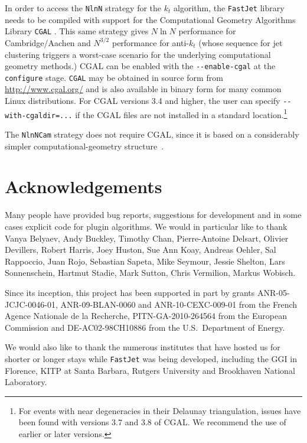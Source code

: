\documentclass[12pt,a4]{article}
\newcommand{\fastjet}{\texttt{FastJet}\xspace}
\newcommand{\ttt}[1]{{\small\texttt{#1}}}
\begin{document}
In order to access the \ttt{NlnN} strategy for the $k_t$ algorithm,
the \fastjet library needs to be compiled with support for the
Computational Geometry Algorithms Library \ttt{CGAL} \cite{CGAL}. This
same strategy gives $N\ln N$ performance for Cambridge/Aachen and
$N^{3/2}$ performance for anti-$k_t$ (whose sequence for jet
clustering triggers a worst-case scenario for the underlying
computational geometry methods.)
%
CGAL can be enabled with the \verb|--enable-cgal| at the
\ttt{configure} stage.
%
\ttt{CGAL} may be obtained in source form from
\url{http://www.cgal.org/} and is also available in binary form for
many common Linux distributions.
%
For CGAL versions 3.4 and higher, the user can specify
\verb|--with-cgaldir=...| if the CGAL files are not installed in a
standard location.\footnote{For events with near degeneracies in their
  Delaunay triangulation, issues have been found with versions 3.7 and
  3.8 of CGAL. We recommend the use of earlier or later versions.}

The \ttt{NlnNCam} strategy does not require CGAL, since it is based on
a considerably simpler computational-geometry structure~\cite{Chan}.






\section*{Acknowledgements}

Many people have provided bug reports, suggestions for development and
in some cases explicit code for plugin algorithms. We would in
particular like to thank
%
%
Vanya Belyaev,
Andy Buckley,
Timothy Chan,
Pierre-Antoine Delsart,
Olivier Devillers,
Robert Harris,
Joey Huston,
Sue Ann Koay,
Andreas Oehler,
Sal Rappoccio,
Juan Rojo,
Sebastian Sapeta,
Mike Seymour,
Jessie Shelton,
Lars Sonnenschein,
Hartmut Stadie,
Mark Sutton,
Chris Vermilion,
Markus Wobisch.

Since its inception, this project has been supported in part by grants
ANR-05-JCJC-0046-01, ANR-09-BLAN-0060 and ANR-10-CEXC-009-01 from the
French Agence Nationale de la Recherche, PITN-GA-2010-264564 from the
European Commission and DE-AC02-98CH10886 from the U.S.\ Department of
Energy.

We would also like to thank the numerous institutes that have hosted
us for shorter or longer stays while \fastjet was being developed,
including the GGI in Florence, KITP at Santa Barbara, Rutgers
University and Brookhaven National Laboratory.
\appendix
\end{document}
